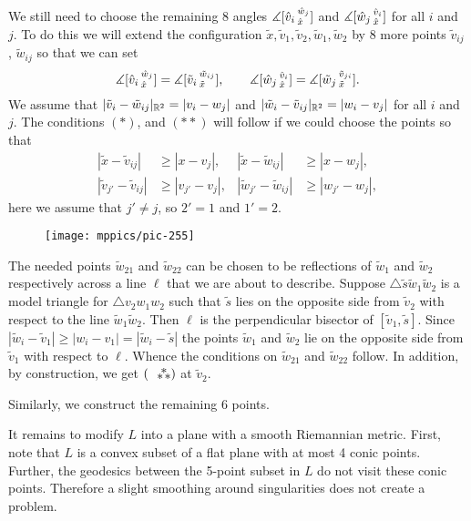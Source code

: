 \documentclass{article}
\begin{document}
We still need to choose the remaining 8 angles $\measuredangle [\hat v_i\,{}^{\hat w_j}_{\hat x}]$ and $\measuredangle [\hat w_j\,{}^{\hat v_i}_{\hat x}]$ for all $i$ and $j$.
To do this we will extend the configuration $\tilde x,\tilde v_1,\tilde v_2,\tilde w_1,\tilde w_2$ by 8 more points 
$\tilde v_{ij}$, $\tilde w_{ij}$ so that we can set 
\[
\measuredangle [\hat v_i\,{}^{\hat w_j}_{\hat x}]=\measuredangle [\tilde v_i\,{}^{\tilde w_{ij}}_{\tilde x}],
\qquad
\measuredangle [\hat w_j\,{}^{\hat v_i}_{\hat x}]=\measuredangle [\tilde w_j\,{}^{\tilde v_{ji}}_{\tilde x}].
\]
We assume that $|\tilde v_i-\tilde w_{ij}|_{\mathbb{R}^2}=|v_i-w_j|$ and $|\tilde w_i-\tilde v_{ij}|_{\mathbb{R}^2}=|w_i-v_j|$ for all $i$ and~$j$.
The conditions $({*})$, and $({*}{*})$ will follow if we could choose the points so that
\begin{align*}
|\tilde x-\tilde v_{ij}|&\ge | x-v_j|,
&
|\tilde x-\tilde w_{ij}|&\ge | x-w_j|,
\\
|\tilde v_{j'}-\tilde v_{ij}|&\ge | v_{j'}-v_j|,
&
|\tilde w_{j'}-\tilde w_{ij}|&\ge |w_{j'}-w_j|,
\end{align*}
here we assume that $j'\ne j$, so $2'=1$ and $1'=2$.

\begin{wrapfigure}{r}{35mm}
\vskip-4mm
\centering
\texttt{[image: mppics/pic-255]}
\end{wrapfigure}

The needed points $\tilde w_{21}$ and $\tilde w_{22}$ can be chosen to be reflections of $\tilde w_{1}$ and $\tilde w_{2}$ respectively across a line $\ell$ that we are about to describe.
Suppose $\triangle \tilde s\tilde w_1 \tilde w_2$ is a model triangle for $\triangle v_2w_1w_2$ such that $\tilde s$ lies on the opposite side from $\tilde v_2$ with respect to the line $\tilde w_1\tilde w_2$.
Then $\ell$ is the perpendicular bisector of $[\tilde v_1, \tilde s]$.
Since $|\tilde w_i-\tilde v_1|\ge | w_i- v_1|=|\tilde w_i-\tilde s|$ the points $\tilde w_1$ and $\tilde w_2$ lie on the opposite side from $\tilde v_1$ with respect to $\ell$.
Whence the conditions on $\tilde w_{21}$ and $\tilde w_{22}$ follow.
In addition, by construction, we get $(\asterism)$ at $\tilde v_2$.

Similarly, we construct the remaining 6 points.

It remains to modify $L$ into a plane with a smooth Riemannian metric.
First, note that $L$ is a convex subset of a flat plane with at most 4 conic points.
Further, the geodesics between the 5-point subset in $L$ do not visit these conic points.
Therefore a slight smoothing around singularities does not create a problem.
\qeds
\end{document}
